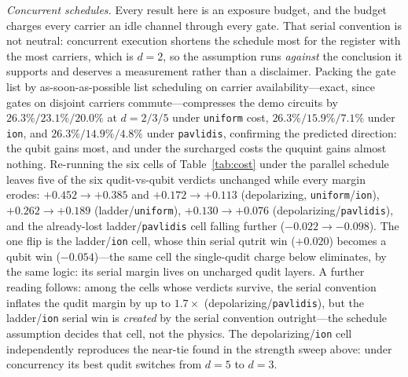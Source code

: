 \documentclass[aps,pra,reprint,superscriptaddress,nofootinbib,floatfix]{revtex4-2}
\begin{document}
\emph{Concurrent schedules.} Every result here is an exposure budget,
and the budget charges every carrier an idle channel through every
gate. That serial convention is not neutral: concurrent execution
shortens the schedule most for the register with the most carriers,
which is $d=2$, so the assumption runs \emph{against} the conclusion it
supports and deserves a measurement rather than a disclaimer. Packing
the gate list by as-soon-as-possible list scheduling on carrier
availability---exact, since gates on disjoint carriers
commute---compresses the demo circuits by
$26.3\%/23.1\%/20.0\%$ at $d=2/3/5$ under \texttt{uniform} cost,
$26.3\%/15.9\%/7.1\%$ under \texttt{ion}, and
$26.3\%/14.9\%/4.8\%$ under \texttt{pavlidis}, confirming the
predicted
direction: the qubit gains most, and under the surcharged costs the
ququint gains almost nothing. Re-running the six cells of
Table~\ref{tab:cost} under the
parallel schedule leaves five of the six qudit-vs-qubit verdicts
unchanged while every margin erodes: $+0.452\to+0.385$ and
$+0.172\to+0.113$ (depolarizing, \texttt{uniform}/\texttt{ion}),
$+0.262\to+0.189$ (ladder/\texttt{uniform}),
$+0.130\to+0.076$ (depolarizing/\texttt{pavlidis}), and the
already-lost ladder/\texttt{pavlidis} cell falling further
($-0.022\to-0.098$). The one flip is
the ladder/\texttt{ion} cell, whose thin serial qutrit win
($+0.020$) becomes a qubit win ($-0.054$)---the same cell the
single-qudit charge below eliminates, by the same logic: its serial
margin lives on uncharged qudit layers. A further
reading follows: among the cells whose verdicts survive, the serial
convention inflates the qudit margin by up to $1.7\times$
(depolarizing/\texttt{pavlidis}), but the ladder/\texttt{ion}
serial win is \emph{created} by the serial convention outright---the
schedule assumption decides that cell, not the physics. The
depolarizing/\texttt{ion} cell
independently reproduces the near-tie found in the strength sweep
above: under concurrency its best qudit switches from $d=5$ to $d=3$.
\end{document}
